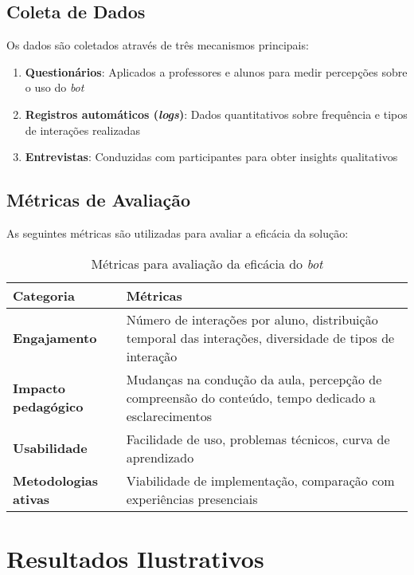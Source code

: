 \subsection{Coleta de Dados}
\label{subsec:coleta}

Os dados são coletados através de três mecanismos principais:

\begin{enumerate}
\item \textbf{Questionários}: Aplicados a professores e alunos para medir
percepções sobre o uso do \textit{bot} 
\item \textbf{Registros automáticos (\textit{logs})}: Dados quantitativos sobre
frequência e tipos de interações realizadas
\item \textbf{Entrevistas}: Conduzidas com participantes para obter insights
qualitativos
\end{enumerate}

\subsection{Métricas de Avaliação}
\label{subsec:metricas}

As seguintes métricas são utilizadas para avaliar a eficácia da solução:

\begin{table}[htb]
\centering
\caption{Métricas para avaliação da eficácia do \textit{bot}}
\label{tab:metricas}
\begin{tabular}{|p{3cm}|p{9cm}|}
\hline
\textbf{Categoria} & \textbf{Métricas} \\
\hline
\textbf{Engajamento} & Número de interações por aluno, distribuição temporal das
interações, diversidade de tipos de interação \\
\hline
\textbf{Impacto pedagógico} & Mudanças na condução da aula, percepção de
compreensão do conteúdo, tempo dedicado a esclarecimentos \\
\hline
\textbf{Usabilidade} & Facilidade de uso, problemas técnicos, curva de
aprendizado \\
\hline
\textbf{Metodologias ativas} & Viabilidade de implementação, comparação com
experiências presenciais \\
\hline
\end{tabular}
\end{table}

\section{Resultados Ilustrativos}
\label{sec:resultados}

